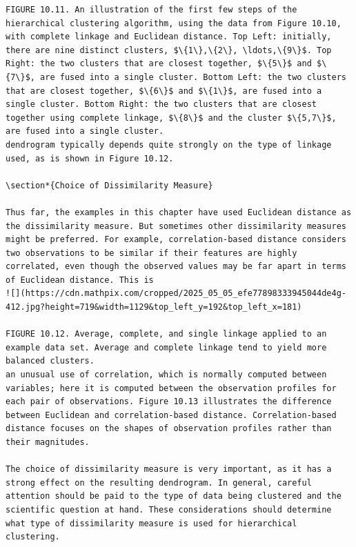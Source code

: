 \documentclass[10pt]{article}
\begin{document}
\begin{verbatim}
FIGURE 10.11. An illustration of the first few steps of the hierarchical clustering algorithm, using the data from Figure 10.10, with complete linkage and Euclidean distance. Top Left: initially, there are nine distinct clusters, $\{1\},\{2\}, \ldots,\{9\}$. Top Right: the two clusters that are closest together, $\{5\}$ and $\{7\}$, are fused into a single cluster. Bottom Left: the two clusters that are closest together, $\{6\}$ and $\{1\}$, are fused into a single cluster. Bottom Right: the two clusters that are closest together using complete linkage, $\{8\}$ and the cluster $\{5,7\}$, are fused into a single cluster.
dendrogram typically depends quite strongly on the type of linkage used, as is shown in Figure 10.12.

\section*{Choice of Dissimilarity Measure}

Thus far, the examples in this chapter have used Euclidean distance as the dissimilarity measure. But sometimes other dissimilarity measures might be preferred. For example, correlation-based distance considers two observations to be similar if their features are highly correlated, even though the observed values may be far apart in terms of Euclidean distance. This is
![](https://cdn.mathpix.com/cropped/2025_05_05_efe77898333945044de4g-412.jpg?height=719&width=1129&top_left_y=192&top_left_x=181)

FIGURE 10.12. Average, complete, and single linkage applied to an example data set. Average and complete linkage tend to yield more balanced clusters.
an unusual use of correlation, which is normally computed between variables; here it is computed between the observation profiles for each pair of observations. Figure 10.13 illustrates the difference between Euclidean and correlation-based distance. Correlation-based distance focuses on the shapes of observation profiles rather than their magnitudes.

The choice of dissimilarity measure is very important, as it has a strong effect on the resulting dendrogram. In general, careful attention should be paid to the type of data being clustered and the scientific question at hand. These considerations should determine what type of dissimilarity measure is used for hierarchical clustering.


\end{verbatim}
\end{document}
